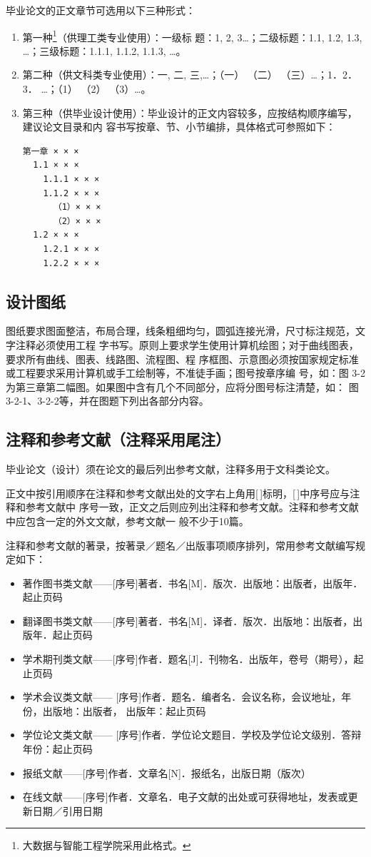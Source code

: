 \documentclass{swfuthesis}
\begin{document}
毕业论文的正文章节可选用以下三种形式：
\begin{enumerate}
\item 第一种\footnote{大数据与智能工程学院采用此格式。}（供理工类专业使用）：一级标
  题：1, 2, 3\ldots；二级标题：1.1, 1.2, 1.3, \ldots；三级标题：1.1.1, 1.1.2, 1.1.3, \ldots。
\item 第二种（供文科类专业使用）：一, 二, 三,\ldots；（一） （二） （三）\ldots；1．2．3．
  \ldots；（1） （2） （3）\ldots。
\item 第三种（供毕业设计使用）：毕业设计的正文内容较多，应按结构顺序编写，建议论文目录和内
  容书写按章、节、小节编排，具体格式可参照如下：
\begin{verbatim}
第一章 × × ×
  1.1 × × ×
    1.1.1 × × ×
    1.1.2 × × ×
      （1）× × ×
      （2）× × ×
  1.2 × × ×
    1.2.1 × × ×
    1.2.2 × × ×
\end{verbatim}
\end{enumerate}

\subsection{设计图纸}

图纸要求图面整洁，布局合理，线条粗细均匀，圆弧连接光滑，尺寸标注规范，文字注释必须使用工程
字书写。原则上要求学生使用计算机绘图；对于曲线图表，要求所有曲线、图表、线路图、流程图、程
序框图、示意图必须按国家规定标准或工程要求采用计算机或手工绘制等，不准徒手画；图号按章序编
号，如：图 3-2 为第三章第二幅图。如果图中含有几个不同部分，应将分图号标注清楚，如：
图3-2-1、3-2-2等，并在图题下列出各部分内容。

\subsection{注释和参考文献（注释采用尾注）}
\label{sec:endnote}

毕业论文（设计）须在论文的最后列出参考文献，注释多用于文科类论文。

正文中按引用顺序在注释和参考文献出处的文字右上角用[\,]标明，[\,]中序号应与注释和参考文献中
序号一致，正文之后则应列出注释和参考文献。注释和参考文献中应包含一定的外文文献，参考文献一
般不少于10篇。

注释和参考文献的著录，按著录／题名／出版事项顺序排列，常用参考文献编写规定如下：
\begin{itemize}
\item 著作图书类文献——[序号]著者．书名[M]．版次．出版地：出版者，出版年．起止页码
\item 翻译图书类文献——[序号]著者．书名[M]．译者．版次．出版地：出版者，出版年．起止页码
\item 学术期刊类文献——[序号]作者．题名[J]．刊物名．出版年，卷号（期号），起止页码
\item 学术会议类文献—— [序号]作者．题名．编者名．会议名称，会议地址，年份，出版地：出版者，
  出版年：起止页码
\item 学位论文类文献—— [序号]作者．学位论文题目．学校及学位论文级别．答辩年份：起止页码
\item 报纸文献——[序号]作者．文章名[N]．报纸名，出版日期（版次）
\item 在线文献——[序号]作者．文章名．电子文献的出处或可获得地址，发表或更新日期／引用日期
\end{itemize}
\end{document}
